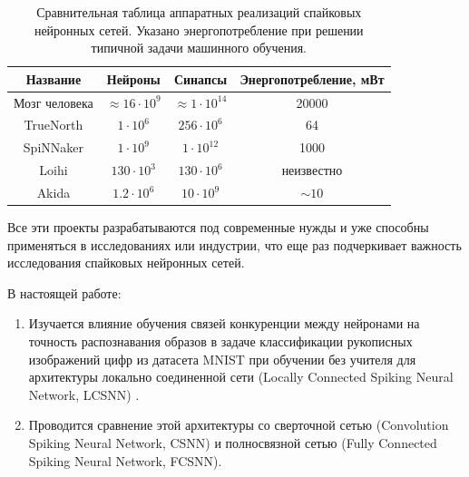 \documentclass[a4paper]{article}
\begin{document}
\begin{table}[h]
 \caption {Сравнительная таблица аппаратных реализаций спайковых нейронных сетей. Указано энергопотребление при решении типичной задачи машинного обучения.}
 \begin{center}
  \begin{tabular}{|c|c|c|c|}
  \hline
  {Название} & {Нейроны} & {Синапсы} & {Энергопотребление, мВт}\\
  \hline
  {Мозг человека \cite{human_brain}} & {$\approx 16 \cdot 10^9$} & {$\approx 1 \cdot 10^{14}$} & {20000}\\
  \hline
  {TrueNorth \cite{TrueNorth}} & {$1 \cdot 10^6$} & {$256 \cdot 10^6$} & {64\footnotemark[1]}\\
  \hline
  {SpiNNaker \cite{SpiNNaker}} & {$1 \cdot 10^9$} & {$1 \cdot 10^{12}$} & {1000\footnotemark[2]}\\
  \hline
  {Loihi \cite{Loihi}} & {$130 \cdot 10^3$} & {$130 \cdot 10^{6}$} & {неизвестно}\\
  \hline
  {Akida \cite{Akida}} & {$1.2 \cdot 10^6$} & {$10 \cdot 10^{9}$} & {$\sim 10$ \footnotemark[3]}\\
  \hline 
  \end{tabular}
 \end{center}
\label{hardware_snn}
\end{table}


Все эти проекты разрабатываются под современные нужды и уже способны применяться в исследованиях или индустрии, что еще раз подчеркивает важность исследования спайковых нейронных сетей.

В настоящей работе:
\begin{enumerate} 
\item Изучается влияние обучения связей конкуренции \cite{MaxActiv1, MaxActiv2, hardware_survey} между нейронами на точность распознавания образов в задаче классификации рукописных изображений цифр из датасета MNIST \cite{MNIST} при обучении без учителя для архитектуры локально соединенной сети (Locally Connected Spiking Neural Network, LCSNN) \cite{saunders2019locally}.

\item Проводится сравнение этой архитектуры со сверточной сетью (Convolution Spiking Neural Network, CSNN) и полносвязной сетью (Fully Connected Spiking Neural Network, FCSNN).

\end{enumerate}
\end{document}
